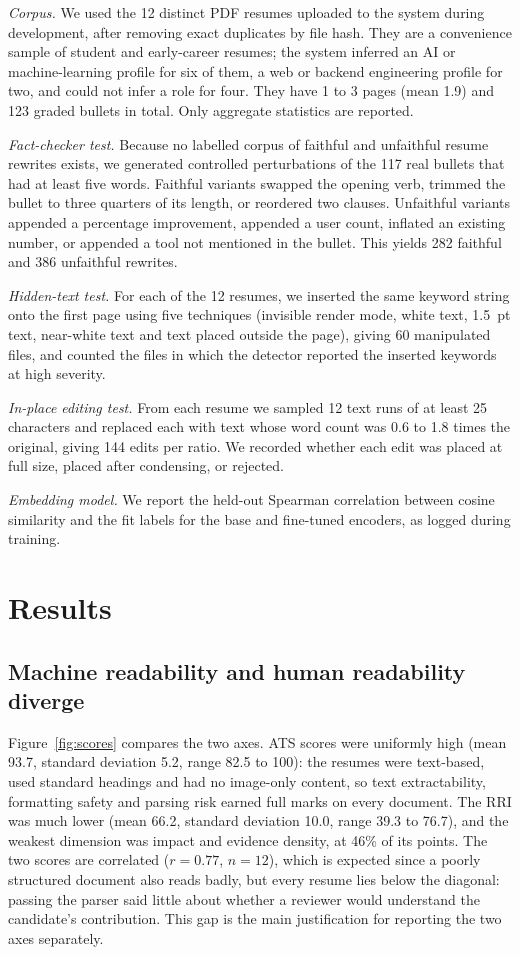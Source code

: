 \documentclass[3p,times,procedia]{elsarticle}
\begin{document}
\textit{Corpus.} We used the 12 distinct PDF resumes uploaded to the system during development, after removing exact duplicates by file hash. They are a convenience sample of student and early-career resumes; the system inferred an AI or machine-learning profile for six of them, a web or backend engineering profile for two, and could not infer a role for four. They have 1 to 3 pages (mean 1.9) and 123 graded bullets in total. Only aggregate statistics are reported.

\textit{Fact-checker test.} Because no labelled corpus of faithful and unfaithful resume rewrites exists, we generated controlled perturbations of the 117 real bullets that had at least five words. Faithful variants swapped the opening verb, trimmed the bullet to three quarters of its length, or reordered two clauses. Unfaithful variants appended a percentage improvement, appended a user count, inflated an existing number, or appended a tool not mentioned in the bullet. This yields 282 faithful and 386 unfaithful rewrites.

\textit{Hidden-text test.} For each of the 12 resumes, we inserted the same keyword string onto the first page using five techniques (invisible render mode, white text, 1.5~pt text, near-white text and text placed outside the page), giving 60 manipulated files, and counted the files in which the detector reported the inserted keywords at high severity.

\textit{In-place editing test.} From each resume we sampled 12 text runs of at least 25 characters and replaced each with text whose word count was 0.6 to 1.8 times the original, giving 144 edits per ratio. We recorded whether each edit was placed at full size, placed after condensing, or rejected.

\textit{Embedding model.} We report the held-out Spearman correlation between cosine similarity and the fit labels for the base and fine-tuned encoders, as logged during training.

\section{Results}
\label{sec:results}

\subsection{Machine readability and human readability diverge}
Figure~\ref{fig:scores} compares the two axes. ATS scores were uniformly high (mean 93.7, standard deviation 5.2, range 82.5 to 100): the resumes were text-based, used standard headings and had no image-only content, so text extractability, formatting safety and parsing risk earned full marks on every document. The RRI was much lower (mean 66.2, standard deviation 10.0, range 39.3 to 76.7), and the weakest dimension was impact and evidence density, at 46\% of its points. The two scores are correlated ($r=0.77$, $n=12$), which is expected since a poorly structured document also reads badly, but every resume lies below the diagonal: passing the parser said little about whether a reviewer would understand the candidate's contribution. This gap is the main justification for reporting the two axes separately.
\end{document}
